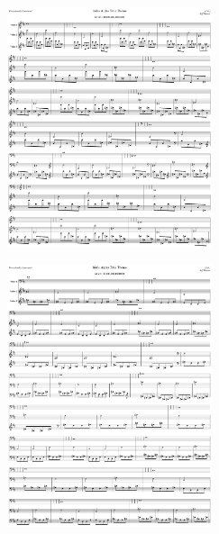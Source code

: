 \begin{figure}[H]                                             
{                                                             
  \setlength{\tabcolsep}{3.0pt}                               
  \setlength\cmidrulewidth{\heavyrulewidth} %
    \begin{subfigure}{0.5\textwidth}                            
  \includegraphics[width=6cm]{music/title_no_67_page_1001.png}%
    \end{subfigure}                                             
  \begin{subfigure}{0.5\textwidth}                            
  \includegraphics[width=6cm]{music/title_no_68_page_1001.png}%
    \end{subfigure}                                             
}                                                             
\end{figure}                                                  


